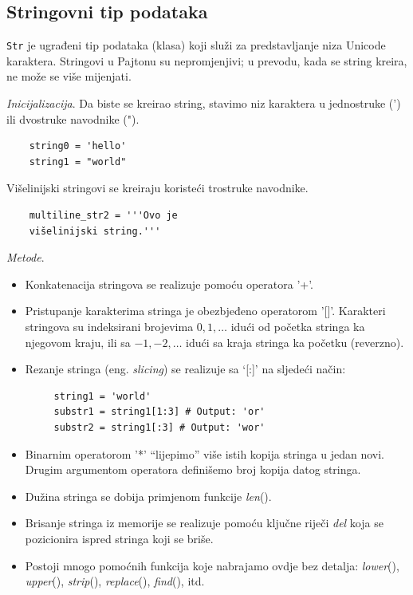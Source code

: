 \subsection{Stringovni tip podataka}

\texttt{Str} je ugrađeni tip podataka (klasa) koji služi za predstavljanje niza Unicode karaktera. Stringovi u Pajtonu su nepromjenjivi; u prevodu, kada se string kreira, ne može se više mijenjati.

\textit{Inicijalizacija}. Da biste se kreirao string, stavimo niz karaktera u jednostruke (') ili dvostruke navodnike (").

\begin{verbatim}
	string0 = 'hello'
	string1 = "world"
\end{verbatim}

Višelinijski stringovi se kreiraju koristeći trostruke navodnike. 

\begin{verbatim}
	multiline_str2 = '''Ovo je
	višelinijski string.'''
\end{verbatim}

\textit{Metode}.
\begin{itemize}
	\item Konkatenacija stringova se realizuje pomoću operatora '+'. 
	\item Pristupanje karakterima stringa je obezbjeđeno operatorom '[]'. Karakteri stringova su indeksirani brojevima $0, 1,\ldots$ idući od početka stringa ka njegovom kraju, ili sa $-1, -2,\ldots$ idući sa kraja stringa ka početku  (reverzno). 
	\item Rezanje stringa (eng. \textit{slicing}) se realizuje sa `[:]' na sljedeći način:
	\begin{verbatim}
	 string1 = 'world'
	 substr1 = string1[1:3] # Output: 'or'
	 substr2 = string1[:3] # Output: 'wor'
	\end{verbatim}
	
	\item  Binarnim operatorom '*' ``lijepimo'' više istih kopija stringa u jedan novi. Drugim argumentom operatora definišemo broj kopija datog stringa.  
	\item Dužina stringa se dobija primjenom funkcije \emph{len}(). 
	\item Brisanje stringa iz memorije se realizuje pomoću ključne riječi \textit{del} koja se pozicionira ispred stringa koji se briše. 
    \item Postoji mnogo pomoćnih funkcija koje nabrajamo ovdje bez detalja: \textit{lower}(), \textit{upper}(), \textit{strip}(), \textit{replace}(), \textit{find}(), itd. 
\end{itemize}

